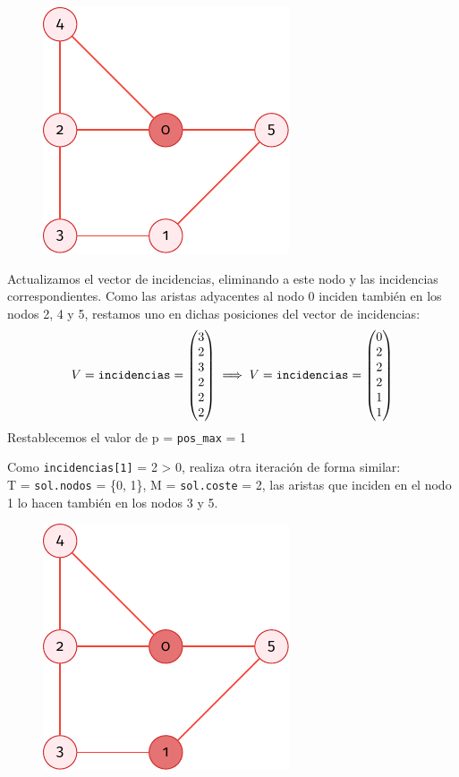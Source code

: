 \documentclass[11pt]{article}
\begin{document}
\begin{figure}[H]
	\centering \includegraphics{./img/grafo-ejemplo-1.pdf}
\end{figure}

Actualizamos el vector de incidencias, eliminando a este nodo y las incidencias correspondientes. Como las aristas adyacentes al nodo 0 inciden también en los nodos 2, 4 y 5, restamos uno en dichas posiciones del vector de incidencias: \\
$$ V = \verb|incidencias| =
\begin{pmatrix}
	3 \\
	2 \\
	3 \\
	2 \\
	2 \\
	2
\end{pmatrix} \implies V = \verb|incidencias| =
\begin{pmatrix}
	0 \\
	2 \\
	2 \\
	2 \\
	1 \\
	1
\end{pmatrix}$$
Restablecemos el valor de p = \verb|pos_max| = 1

Como \verb|incidencias[1]| = 2 > 0, realiza otra iteración de forma similar:\\

 T = \verb|sol.nodos| = \{0, 1\}, M = \verb|sol.coste| = 2, las aristas que inciden en el nodo 1 lo hacen también en los nodos 3 y 5.\\

\begin{figure}[H]
	\centering \includegraphics{./img/grafo-ejemplo-2.pdf}
\end{figure}
\end{document}
